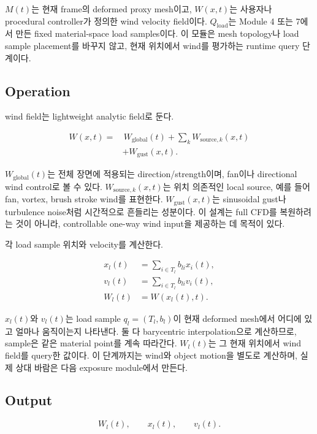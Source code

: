 \documentclass[11pt,a4paper]{article}
\begin{document}
$M(t)$는 현재 frame의 deformed proxy mesh이고, $W(x,t)$는 사용자나 procedural controller가 정의한 wind velocity field이다.
$Q_{\mathrm{load}}$는 Module 4 또는 7에서 만든 fixed material-space load samples이다.
이 모듈은 mesh topology나 load sample placement를 바꾸지 않고, 현재 위치에서 wind를 평가하는 runtime query 단계이다.

\subsection*{Operation}

wind field는 lightweight analytic field로 둔다.

\begin{equation}
\begin{aligned}
W(x,t)=&\,W_{\mathrm{global}}(t)
+\sum_kW_{\mathrm{source},k}(x,t)\\
&+W_{\mathrm{gust}}(x,t).
\end{aligned}
\end{equation}

$W_{\mathrm{global}}(t)$는 전체 장면에 적용되는 direction/strength이며, fan이나 directional wind control로 볼 수 있다.
$W_{\mathrm{source},k}(x,t)$는 위치 의존적인 local source, 예를 들어 fan, vortex, brush stroke wind를 표현한다.
$W_{\mathrm{gust}}(x,t)$는 sinusoidal gust나 turbulence noise처럼 시간적으로 흔들리는 성분이다.
이 설계는 full CFD를 복원하려는 것이 아니라, controllable one-way wind input을 제공하는 데 목적이 있다.

각 load sample 위치와 velocity를 계산한다.

\begin{align}
x_l(t)&=\sum_{i\in T_l}b_{li}x_i(t),\\
v_l(t)&=\sum_{i\in T_l}b_{li}v_i(t),\\
W_l(t)&=W(x_l(t),t).
\end{align}

$x_l(t)$와 $v_l(t)$는 load sample $q_l=(T_l,b_l)$이 현재 deformed mesh에서 어디에 있고 얼마나 움직이는지 나타낸다.
둘 다 barycentric interpolation으로 계산하므로, sample은 같은 material point를 계속 따라간다.
$W_l(t)$는 그 현재 위치에서 wind field를 query한 값이다.
이 단계까지는 wind와 object motion을 별도로 계산하며, 실제 상대 바람은 다음 exposure module에서 만든다.

\subsection*{Output}

\begin{equation}
W_l(t),\qquad x_l(t),\qquad v_l(t).
\end{equation}
\end{document}
